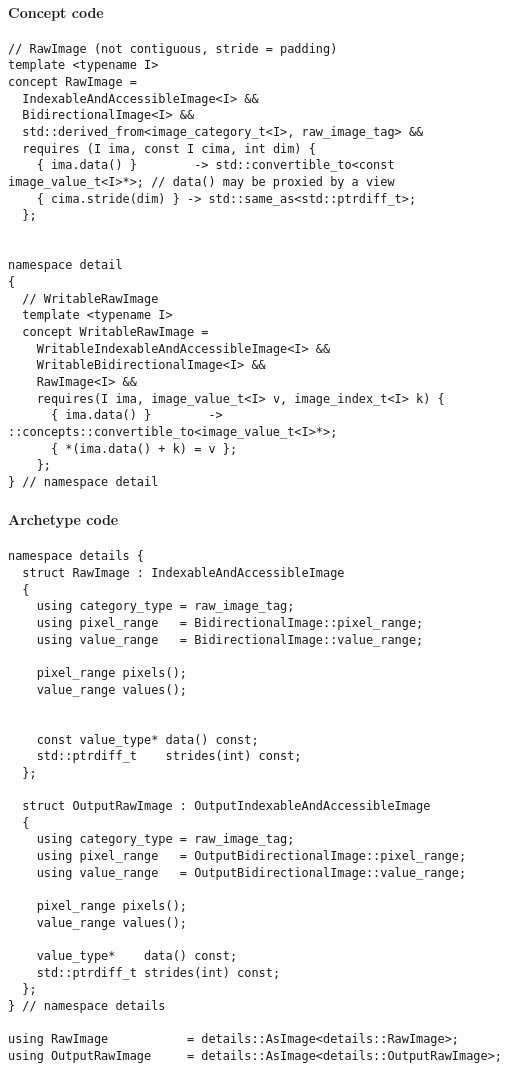 \paragraph{Concept code}

\begin{verbatim}
// RawImage (not contiguous, stride = padding)
template <typename I>
concept RawImage =
  IndexableAndAccessibleImage<I> &&
  BidirectionalImage<I> &&
  std::derived_from<image_category_t<I>, raw_image_tag> &&
  requires (I ima, const I cima, int dim) {
    { ima.data() }        -> std::convertible_to<const image_value_t<I>*>; // data() may be proxied by a view
    { cima.stride(dim) } -> std::same_as<std::ptrdiff_t>;
  };


namespace detail
{
  // WritableRawImage
  template <typename I>
  concept WritableRawImage =
    WritableIndexableAndAccessibleImage<I> &&
    WritableBidirectionalImage<I> &&
    RawImage<I> &&
    requires(I ima, image_value_t<I> v, image_index_t<I> k) {
      { ima.data() }        -> ::concepts::convertible_to<image_value_t<I>*>;
      { *(ima.data() + k) = v };
    };
} // namespace detail
\end{verbatim}


\paragraph{Archetype code}

\begin{verbatim}
namespace details {
  struct RawImage : IndexableAndAccessibleImage
  {
    using category_type = raw_image_tag;
    using pixel_range   = BidirectionalImage::pixel_range;
    using value_range   = BidirectionalImage::value_range;

    pixel_range pixels();
    value_range values();


    const value_type* data() const;
    std::ptrdiff_t    strides(int) const;
  };

  struct OutputRawImage : OutputIndexableAndAccessibleImage
  {
    using category_type = raw_image_tag;
    using pixel_range   = OutputBidirectionalImage::pixel_range;
    using value_range   = OutputBidirectionalImage::value_range;

    pixel_range pixels();
    value_range values();

    value_type*    data() const;
    std::ptrdiff_t strides(int) const;
  };
} // namespace details

using RawImage           = details::AsImage<details::RawImage>;
using OutputRawImage     = details::AsImage<details::OutputRawImage>;
\end{verbatim}


